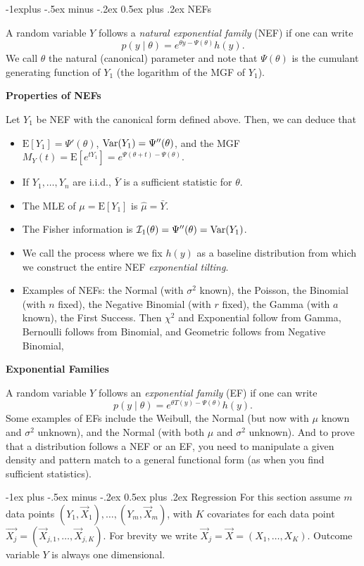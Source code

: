 \documentclass[10pt,landscape]{article}
\makeatletter
\renewcommand{\section}{\@startsection{section}{1}{0mm}%
                                {-1ex plus -.5ex minus -.2ex}%
                                {0.5ex plus .2ex}%
                                {\normalfont\large\bfseries}}
\renewcommand{\subsection}{\@startsection{subsection}{2}{0mm}%
                                {-1explus -.5ex minus -.2ex}%
                                {0.5ex plus .2ex}%
                                {\normalfont\normalsize\bfseries}}
\newcommand{\E}{\text{E}}
\makeatother
\begin{document}
\begin{multicols*}{3}
\subsection{NEFs}

A random variable $Y$ follows a \emph{natural exponential family} (NEF) if one can write $$p(y\mid \theta)=e^{\theta y-\Psi(\theta)}h(y).$$ We call $\theta$ the natural (canonical) parameter and note that $\Psi(\theta)$ is the cumulant generating function of $Y_1$ (the logarithm of the MGF of $Y_1$).

\textbf{Properties of NEFs}

Let $Y_1$ be NEF with the canonical form defined above. Then, we can deduce that 
\begin{itemize}
    \item $\E [Y_1]=\Psi'(\theta)$, $\operatorname{Var}( Y_1)=\Psi''(\theta)$, and the MGF $M_Y(t)=\E[e^{tY_1}]=e^{\Psi(\theta+t)-\Psi(\theta)}$.
    \item If $Y_1,\dots,Y_n$ are i.i.d., $\bar{Y}$ is a sufficient statistic for $\theta$.
    \item The MLE of $\mu=\E [Y_1]$ is $\hat{\mu}=\bar{Y}$.
    \item The Fisher information is $\mathcal{I}_1(\theta)=\Psi''(\theta)=\operatorname{Var}(Y_1)$.
    \item We call the process where we fix $h(y)$ as a baseline distribution from which we construct the entire NEF \emph{exponential tilting}.
    \item Examples of NEFs: the Normal (with $\sigma^2$ known), the Poisson, the Binomial (with $n$ fixed), the Negative Binomial (with $r$ fixed), the Gamma (with $a$ known), the First Success. Then $\chi^2$ and Exponential follow from Gamma, Bernoulli follows from Binomial, and Geometric follows from Negative Binomial,
\end{itemize}

\textbf{Exponential Families}

A random variable $Y$ follows an \emph{exponential family} (EF) if one can write $$p(y\mid \theta)=e^{\theta T(y)-\Psi(\theta)}h(y).$$ Some examples of EFs include the Weibull, the Normal (but now with $\mu$ known and $\sigma^2$ unknown), and the Normal (with both $\mu$ and $\sigma^2$ unknown). And to prove that a distribution follows a NEF or an EF, you need to manipulate a given density and pattern match to a general functional form (as when you find sufficient statistics).


\section{Regression}
For this section assume $m$ data points $(Y_1,\vec{X}_1),\ldots,(Y_m,\vec{X}_m)$, with $K$ covariates for each data point $\vec{X_j}=(\vec{X}_{j,1},\ldots,\vec{X}_{j,K})$. For brevity we write $\vec{X}_j=\vec{X}=(X_{1},\ldots,X_{K})$. Outcome variable $Y$ is always one dimensional.


\end{multicols*}
\end{document}
